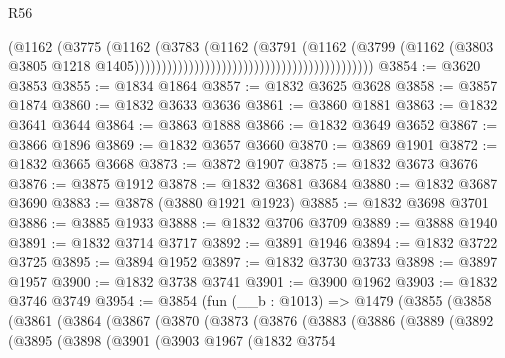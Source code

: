 \begin{lexlean}{R56}
\begin{coremodule}
                                                                        (@1162
                                                                          (@3775
                                                                            (@1162
                                                                              (@3783
                                                                                (@1162
                                                                                  (@3791
                                                                                    (@1162
                                                                                      (@3799
                                                                                        (@1162
                                                                                          (@3803
                                                                                            @3805
                                                                                            @1218
                                                                                            @1405))))))))))))))))))))))))))))))))))))))))))))
@3854 := @3620 @3853
@3855 := @1834 @1864
@3857 := @1832 @3625 @3628
@3858 := @3857 @1874
@3860 := @1832 @3633 @3636
@3861 := @3860 @1881
@3863 := @1832 @3641 @3644
@3864 := @3863 @1888
@3866 := @1832 @3649 @3652
@3867 := @3866 @1896
@3869 := @1832 @3657 @3660
@3870 := @3869 @1901
@3872 := @1832 @3665 @3668
@3873 := @3872 @1907
@3875 := @1832 @3673 @3676
@3876 := @3875 @1912
@3878 := @1832 @3681 @3684
@3880 := @1832 @3687 @3690
@3883 := @3878 (@3880 @1921 @1923)
@3885 := @1832 @3698 @3701
@3886 := @3885 @1933
@3888 := @1832 @3706 @3709
@3889 := @3888 @1940
@3891 := @1832 @3714 @3717
@3892 := @3891 @1946
@3894 := @1832 @3722 @3725
@3895 := @3894 @1952
@3897 := @1832 @3730 @3733
@3898 := @3897 @1957
@3900 := @1832 @3738 @3741
@3901 := @3900 @1962
@3903 := @1832 @3746 @3749
@3954 := @3854
    (fun (__b : @1013) =>
    @1479
      (@3855
        (@3858
          (@3861
            (@3864
              (@3867
                (@3870
                  (@3873
                    (@3876
                      (@3883
                        (@3886
                          (@3889
                            (@3892
                              (@3895
                                (@3898
                                  (@3901
                                    (@3903
                                      @1967
                                      (@1832
                                        @3754

\end{coremodule}
\end{lexlean}
